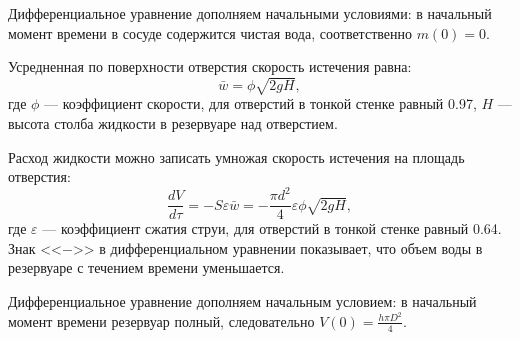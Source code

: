 Дифференциальное уравнение дополняем начальными условиями: в начальный момент времени в сосуде содержится чистая вода, соответственно $m(0)=0.$


Усредненная по поверхности отверстия скорость истечения равна:
\begin{equation}
\bar{w}=\phi \sqrt{2gH},
\end{equation} 
где $\phi$ --- коэффициент скорости, для отверстий в тонкой стенке равный 0.97, $H$ --- высота столба жидкости в резервуаре над отверстием.

Расход жидкости можно записать умножая скорость истечения на площадь отверстия:
\begin{equation}
\dfrac{d V}{d \tau} = - S  \varepsilon \bar{w}= -\dfrac{\pi d^2}{4} \varepsilon  \phi \sqrt{2gH},
\end{equation}
где $\varepsilon$ --- коэффициент сжатия струи, для отверстий в тонкой стенке равный 0.64. Знак  <<$-$>> в дифференциальном уравнении показывает,  что объем воды в резервуаре с течением времени уменьшается. 

Дифференциальное уравнение дополняем начальным условием: в начальный момент времени резервуар полный, следовательно $V(0)=\frac{h \pi D^2}{4}$.




